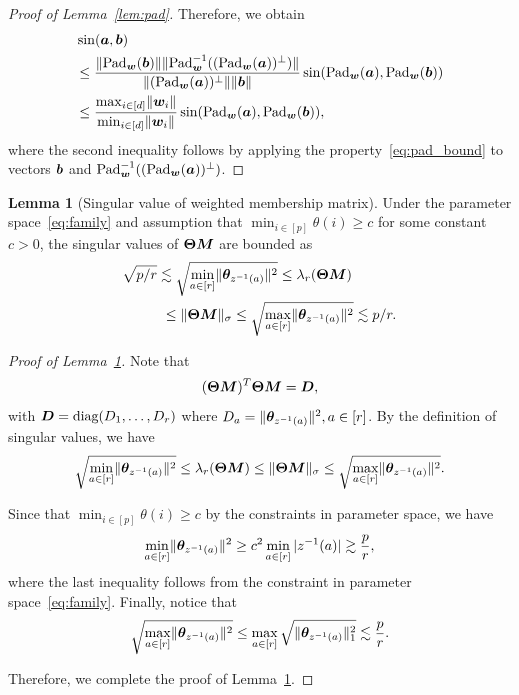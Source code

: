 \documentclass[journal]{IEEEtran}
\theoremstyle{definition}
\newtheorem{lem}{Lemma}
\theoremstyle{definition}
\begin{document}
\begin{proof}[Proof of Lemma~\ref{lem:pad}]
Therefore, we obtain 
\begin{align}
    &\sin(\bm{a}, \bm{b}) \\
    &\leq \frac{ \lVert\text{Pad}_{\bm{w}}(\bm{b}) \rVert \lVert\text{Pad}_{\bm{w}}^{-1}((\text{Pad}_{\bm{w}}(\bm{a}))^{\perp})  \rVert }{ \lVert(\text{Pad}_{\bm{w}}(\bm{a}))^{\perp} \rVert \lVert\bm{b}\rVert }  \sin(\text{Pad}_{\bm{w}}(\bm{a}), \text{Pad}_{\bm{w}}(\bm{b}))\\
    & \leq \frac{ \max_{i \in [d]} \lVert\bm{w}_i\rVert }{\min_{i \in [d]} \lVert\bm{w}_i\rVert} \sin(\text{Pad}_{\bm{w}}(\bm{a}), \text{Pad}_{\bm{w}}(\bm{b})),
\end{align}
where the second inequality follows by applying the property~\eqref{eq:pad_bound} to vectors $\bm{b}$ and $\text{Pad}_{\bm{w}}^{-1}((\text{Pad}_{\bm{w}}(\bm{a}))^{\perp})$.
\end{proof}

\begin{lem}[Singular value of weighted membership matrix]\label{lem:singular_thetam} Under the parameter space~\eqref{eq:family} and assumption that $\min_{i \in [p]} \theta(i) \geq c$ {for some constant $c >0$}, the singular values of $\boldsymbol{\Theta} \bm M$ are bounded as 
\begin{align}
    \sqrt{p/r} &\lesssim \sqrt{ \min_{a \in [r]}\onormSize{}{ \mtheta_{ z^{-1}(a)} }^2 }  \leq \lambda_{r}(\mTheta \mM) \\
    &\ \leq \onormSize{}{\mTheta \mM}_{\sigma} \leq\sqrt{ \max_{a \in [r]}\onormSize{}{ \mtheta_{ z^{-1}(a)} }^2 } \lesssim  p /r . \label{eq:membership2}
\end{align}
\end{lem}


\begin{proof}[Proof of Lemma~\ref{lem:singular_thetam}] Note that 
\begin{equation}
    (\boldsymbol{\Theta}\bm M)^T \boldsymbol{\Theta} \bm M = \bm{D},
\end{equation}
with $\bm{D} = \text{diag}(D_1,\ldots, D_r)$ where $D_a = \lVert\boldsymbol{\theta}_{z^{-1}(a)}\rVert^2, a \in [r]$.
By the definition of singular values, we have 
\begin{equation}
     \sqrt{\min_{a \in [r]}\lVert \boldsymbol{\theta}_{ z^{-1}(a)} \rVert^2 } \leq \lambda_r(\boldsymbol{\Theta} \bm M) \leq \lVert\boldsymbol{\Theta}\bm M\rVert_{\sigma} \leq \sqrt{ \max_{a \in [r]}\lVert \boldsymbol{\theta}_{ z^{-1}(a)} \rVert^2}.
\end{equation}

Since that $\min_{i \in [p]}\theta(i) \geq c$ by the constraints in parameter space, we have  
\begin{equation}
   \min_{a \in [r]} \lVert \boldsymbol{\theta}_{ z^{-1}(a)} \rVert^2 \geq c^2 \min_{a \in [r]} |z^{-1}(a)| \gtrsim \frac{p}{r},
\end{equation}
where the last inequality follows from the constraint in parameter space~\eqref{eq:family}. Finally, notice that 
\begin{equation}
    \sqrt{\max_{a \in [r]}\lVert \boldsymbol{\theta}_{ z^{-1}(a)} \rVert^2 } \leq \max_{a \in [r]} \sqrt{ \lVert \boldsymbol{\theta}_{ z^{-1}(a)} \rVert^2_1} \lesssim \frac{p}{r}.
\end{equation}

 Therefore, we complete the proof of Lemma~\ref{lem:singular_thetam}.
\end{proof}
\end{document}
